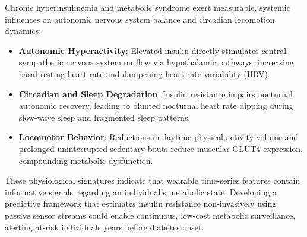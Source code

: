 \documentclass[12pt,a4paper,oneside]{report}
\begin{document}
Chronic hyperinsulinemia and metabolic syndrome exert measurable, systemic influences on autonomic nervous system balance and circadian locomotion dynamics:
\begin{itemize}
    \item \textbf{Autonomic Hyperactivity}: Elevated insulin directly stimulates central sympathetic nervous system outflow via hypothalamic pathways, increasing basal resting heart rate and dampening heart rate variability (HRV).
    \item \textbf{Circadian and Sleep Degradation}: Insulin resistance impairs nocturnal autonomic recovery, leading to blunted nocturnal heart rate dipping during slow-wave sleep and fragmented sleep patterns.
    \item \textbf{Locomotor Behavior}: Reductions in daytime physical activity volume and prolonged uninterrupted sedentary bouts reduce muscular GLUT4 expression, compounding metabolic dysfunction.
\end{itemize}

These physiological signatures indicate that wearable time-series features contain informative signals regarding an individual's metabolic state. Developing a predictive framework that estimates insulin resistance non-invasively using passive sensor streams could enable continuous, low-cost metabolic surveillance, alerting at-risk individuals years before diabetes onset.
\end{document}
